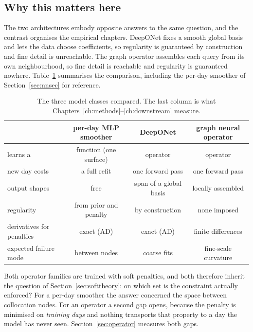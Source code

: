 \subsection{Why this matters here}

The two architectures embody opposite answers to the same question, and the contrast organises
the empirical chapters. DeepONet fixes a smooth global basis and lets the data choose
coefficients, so regularity is guaranteed by construction and fine detail is unreachable. The
graph operator assembles each query from its own neighbourhood, so fine detail is reachable and
regularity is guaranteed nowhere. Table~\ref{tab:opcompare} summarises the comparison, including
the per-day smoother of Section~\ref{sec:nnsec} for reference.

\begin{table}[htbp]\centering\small
\caption{The three model classes compared. The last column is what
Chapters~\ref{ch:methods}--\ref{ch:downstream} measure.}\label{tab:opcompare}
\begin{tabular}{lccc}
\toprule
 & per-day MLP smoother & DeepONet & graph neural operator \\
\midrule
learns a & function (one surface) & operator & operator \\
new day costs & a full refit & one forward pass & one forward pass \\
output shapes & free & span of a global basis & locally assembled \\
regularity & from prior and penalty & by construction & none imposed \\
derivatives for penalties & exact (AD) & exact (AD) & finite differences \\
expected failure mode & between nodes & coarse fits & fine-scale curvature \\
\bottomrule
\end{tabular}
\end{table}

Both operator families are trained with soft penalties, and both therefore inherit the question
of Section~\ref{sec:softtheory}: on which set is the constraint actually enforced? For a per-day
smoother the answer concerned the space between collocation nodes. For an operator a second gap
opens, because the penalty is minimised on \emph{training days} and nothing transports that
property to a day the model has never seen. Section~\ref{sec:operator} measures both gaps.

